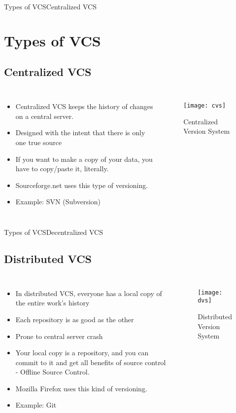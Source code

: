 \documentclass{beamer}
\begin{document}
\begin{frame}{Types of VCS}{Centralized VCS}
\section{Types of VCS}
\subsection{Centralized VCS}
  \begin{columns}
\begin{itemize}
  \item {
    Centralized VCS keeps the history of changes on a central server.
  }
  \item {
    Designed with the intent that there is only one true source  
  }
  \item {
    If you want to make a copy of your data, you have to copy/paste it, literally.  
  }
  \item{
	Sourceforge.net uses this type of versioning.  
  }
  \item{
      Example: SVN (Subversion)
  }  
  \end{itemize}
\begin{figure}
	 \texttt{[image: cvs]}
	 \caption{Centralized Version System \cite{website}}
 \end{figure}
\end{columns}
\end{frame}	

\begin{frame}{Types of VCS}{Decentralized VCS}
\subsection{Distributed VCS}
\begin{columns}
\begin{itemize}
		  \item {
		    In distributed VCS, everyone has a local copy of the entire work’s history
		  }
		  \item {
		    Each repository is as good as the other
		  }
		  \item{
			Prone to central server crash
		  }
		  \item{
			Your local copy is a repository, and you can commit to it and get all benefits of source control - Offline Source Control.
		  }	  
		  \item{
			Mozilla Firefox uses this kind of versioning.  
		  }
		  \item{
            Example: Git		  
		  }
	  \end{itemize}
\begin{figure}
	 \texttt{[image: dvs]}
	 \caption{Distributed Version System \cite{website}}
 \end{figure}
\end{columns}
\end{frame}	
\end{document}
